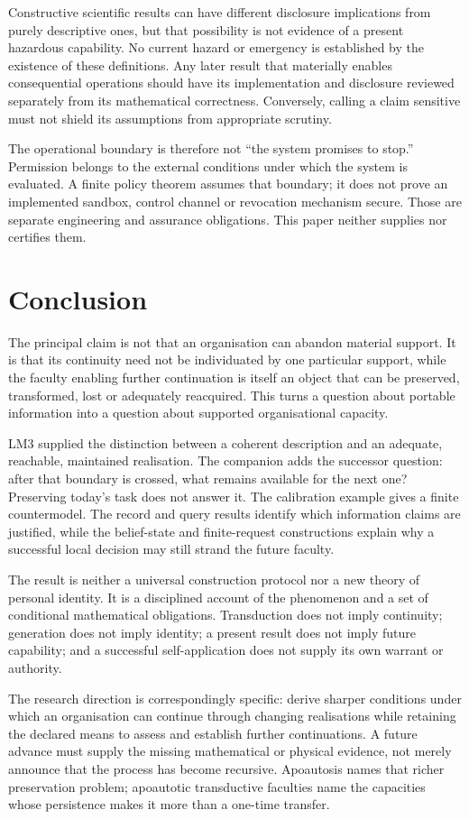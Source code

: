 Constructive scientific results can have different disclosure implications from purely descriptive ones, but that possibility is not evidence of a present hazardous capability. No current hazard or emergency is established by the existence of these definitions. Any later result that materially enables consequential operations should have its implementation and disclosure reviewed separately from its mathematical correctness. Conversely, calling a claim sensitive must not shield its assumptions from appropriate scrutiny.

The operational boundary is therefore not ``the system promises to stop.'' Permission belongs to the external conditions under which the system is evaluated. A finite policy theorem assumes that boundary; it does not prove an implemented sandbox, control channel or revocation mechanism secure. Those are separate engineering and assurance obligations. This paper neither supplies nor certifies them.

\section{Conclusion}
\label{sec:conclusion}

The principal claim is not that an organisation can abandon material support. It is that its continuity need not be individuated by one particular support, while the faculty enabling further continuation is itself an object that can be preserved, transformed, lost or adequately reacquired. This turns a question about portable information into a question about supported organisational capacity.

LM3 supplied the distinction between a coherent description and an adequate, reachable, maintained realisation. The companion adds the successor question: after that boundary is crossed, what remains available for the next one? Preserving today's task does not answer it. The calibration example gives a finite countermodel. The record and query results identify which information claims are justified, while the belief-state and finite-request constructions explain why a successful local decision may still strand the future faculty.

The result is neither a universal construction protocol nor a new theory of personal identity. It is a disciplined account of the phenomenon and a set of conditional mathematical obligations. Transduction does not imply continuity; generation does not imply identity; a present result does not imply future capability; and a successful self-application does not supply its own warrant or authority.

The research direction is correspondingly specific: derive sharper conditions under which an organisation can continue through changing realisations while retaining the declared means to assess and establish further continuations. A future advance must supply the missing mathematical or physical evidence, not merely announce that the process has become recursive. Apoautosis names that richer preservation problem; apoautotic transductive faculties name the capacities whose persistence makes it more than a one-time transfer.
